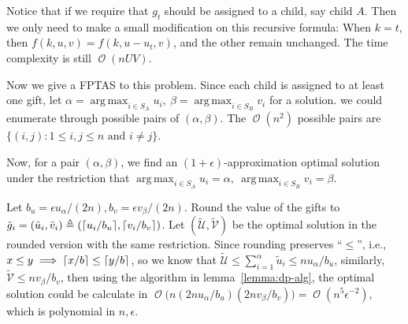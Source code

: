 \documentclass[12pt, a4paper]{article}
\DeclarePairedDelimiter{\ceil}{\lceil}{\rceil}
\DeclareMathOperator*{\argmax}{arg\,max}
\newcommand{\defeq}{\triangleq}
\DeclareMathOperator*{\ord}{\mathcal{O}}
\begin{document}
Notice that if we require that $g_t$ should be assigned to a child, say child $A$.
Then we only need to make a small modification on this recursive formula: When $k = t$,
then $f(k, u, v) = f(k, u-u_t, v)$, and the other remain unchanged. The time complexity
is still $\ord(nUV)$.

Now we give a FPTAS to this problem. Since each child is assigned to at least one gift,
let $\alpha = \argmax_{i \in S_A} u_i,\  \beta = \argmax_{i \in S_B} v_i$ for a solution.
we could enumerate through possible pairs of $(\alpha, \beta)$. The $\ord(n^2)$ possible pairs are
$\{ (i, j) : 1 \leq i, j \leq n \text{ and } i \neq j \}$.

Now, for a pair $(\alpha, \beta)$, we find an $(1+\epsilon)$-approximation optimal solution
under the restriction that $\argmax_{i \in S_A} u_i = \alpha,\  \argmax_{i \in S_B} v_i = \beta$.

Let $b_u = \epsilon u_\alpha / (2n), b_v = \epsilon v_\beta / (2n)$. Round the value of the gifts
to $\tilde{g}_i = (\tilde{u}_i, \tilde{v}_i) \defeq ( \ceil{u_i / b_u}, \ceil{v_i / b_v})$.
\newcommand*{\tU}{\tilde{\mathcal{U}}}%
\newcommand*{\tV}{\tilde{\mathcal{V}}}%
Let $(\tU, \tV)$ be the optimal solution in the rounded version with the same restriction.
Since rounding preserves ``$\leq$'', i.e., $x \leq y \implies \ceil{x/b} \leq \ceil{y/b}$,
so we know that $\tU \leq \sum_{i = 1}^{\alpha} \tilde{u}_i \leq n u_\alpha / b_u$, similarly,
$\tV \leq n v_\beta / b_v$, then using the algorithm in lemma~\ref{lemma:dp-alg},
the optimal solution could be calculate in $\ord\big(n (2 n u_\alpha / b_u) (2 n v_\beta / b_v) \big)
= \ord(n^5 \epsilon^{-2})$, which is polynomial in $n, \epsilon$.
\end{document}

